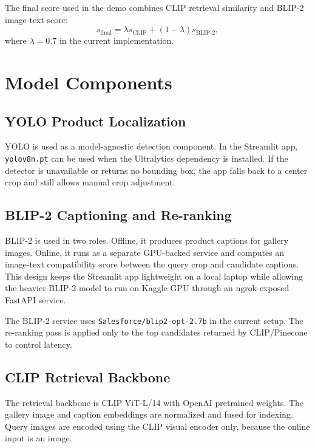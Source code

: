 \documentclass[12pt, a4paper]{article}
\begin{document}
The final score used in the demo combines CLIP retrieval similarity and BLIP-2 image-text score:
\begin{equation}
    s_{\text{final}} = \lambda s_{\text{CLIP}} + (1-\lambda)s_{\text{BLIP-2}},
    \label{eq:final-score}
\end{equation}
where $\lambda=0.7$ in the current implementation.

\section{Model Components}

\subsection{YOLO Product Localization}

YOLO is used as a model-agnostic detection component. In the Streamlit app, \texttt{yolov8n.pt} can be used when the Ultralytics dependency is installed. If the detector is unavailable or returns no bounding box, the app falls back to a center crop and still allows manual crop adjustment.

\subsection{BLIP-2 Captioning and Re-ranking}

BLIP-2 is used in two roles. Offline, it produces product captions for gallery images. Online, it runs as a separate GPU-backed service and computes an image-text compatibility score between the query crop and candidate captions. This design keeps the Streamlit app lightweight on a local laptop while allowing the heavier BLIP-2 model to run on Kaggle GPU through an ngrok-exposed FastAPI service.

The BLIP-2 service uses \texttt{Salesforce/blip2-opt-2.7b} in the current setup. The re-ranking pass is applied only to the top candidates returned by CLIP/Pinecone to control latency.

\subsection{CLIP Retrieval Backbone}

The retrieval backbone is CLIP ViT-L/14 with OpenAI pretrained weights. The gallery image and caption embeddings are normalized and fused for indexing. Query images are encoded using the CLIP visual encoder only, because the online input is an image.
\end{document}
